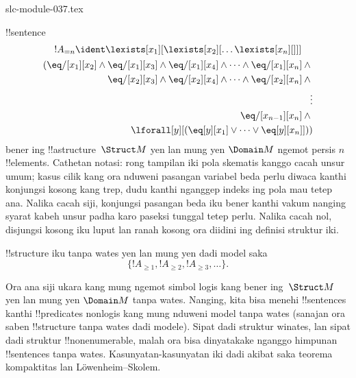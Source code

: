 \begin{filecontents*}[overwrite]{slc-module-037.tex}
\begin{prop}
!!{sentence}
\begin{multline*}
!A_{= n} \ident \lexists[x_1][\lexists[x_2][\dots\lexists[x_n][{}]]] \\
\begin{aligned}
  (\eq/[x_1][x_2] \land {}
  \eq/[x_1][x_3] \land \eq/[x_1][x_4] \land \dots \land \eq/[x_1][x_n] \land {}\\
\eq/[x_2][x_3] \land \eq/[x_2][x_4] \land \dots \land {} \eq/[x_2][x_n] \land {} \\
\vdots\\
\eq/[x_{n-1}][x_n] \land {} \\
\lforall[y][(\eq[y][x_1] \lor \dots \lor \eq[y][x_n]]))
\end{aligned}
\end{multline*}
bener ing !!a{structure}~$\Struct M$ yen lan
mung yen $\Domain M$ ngemot persis
$n$ !!{element}s.
Cathetan notasi: rong tampilan iki pola skematis
kanggo cacah unsur umum; kasus cilik kang ora
nduweni pasangan variabel beda perlu diwaca
kanthi konjungsi kosong kang trep, dudu
kanthi nganggep indeks ing pola mau tetep ana. Nalika cacah siji, konjungsi pasangan beda iku bener kanthi vakum nanging syarat kabeh unsur padha karo paseksi tunggal tetep perlu. Nalika cacah nol, disjungsi kosong iku luput lan ranah kosong ora diidini ing definisi struktur iki.
\end{prop}

\begin{prop}
!!{structure} iku tanpa wates yen lan mung
yen dadi model saka
\[
\{!A_{\ge 1}, !A_{\ge 2}, !A_{\ge 3}, \dots \}.
\]
\end{prop}

Ora ana siji ukara kang mung ngemot simbol logis
kang bener ing~$\Struct M$ yen lan mung yen
$\Domain M$ tanpa wates. Nanging, kita bisa
menehi !!{sentence}s kanthi !!{predicate}s
nonlogis kang mung nduweni model tanpa wates
(sanajan ora saben !!{structure} tanpa wates
dadi modele). Sipat dadi struktur winates, lan
sipat dadi struktur !!{nonenumerable}, malah
ora bisa dinyatakake nganggo himpunan
!!{sentence}s tanpa wates. Kasunyatan-kasunyatan
iki dadi akibat saka teorema kompaktitas lan
L\"owenheim--Skolem.


\end{filecontents*}

